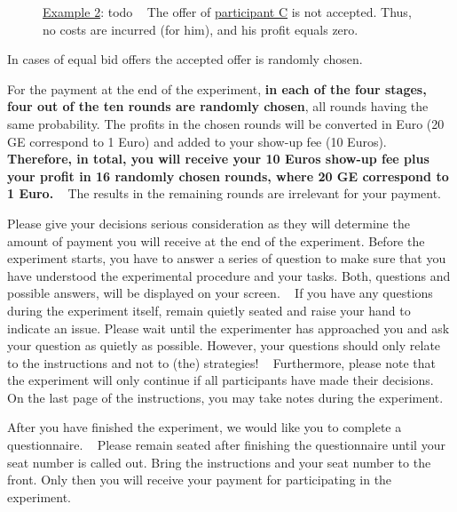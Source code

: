 \documentclass[11pt]{article}
\begin{document}
\begin{figure}[h!] 
	\begin{minipage}[t]{1\linewidth} 
		\begin{tcolorbox}[colback=pink,arc=0pt,colframe=black!25]
			\underline{Example 2}: todo ~\bigbreak 
			\vspace{4cm}
			The offer of \underline{participant C} is not accepted. Thus, no costs are incurred (for him), and his profit equals zero.         
		\end{tcolorbox} 
	\end{minipage}  
\end{figure}



In cases of equal bid offers the accepted offer is randomly chosen.



For the payment at the end of the experiment, \textbf{in each of the four stages, four out of the ten rounds are randomly chosen}, all rounds having the same probability. The profits in the chosen rounds will be converted in Euro (20 GE correspond to 1 Euro) and added to your show-up fee (10 Euros). \textbf{Therefore, in total, you will receive your 10 Euros show-up fee plus your profit in 16 randomly chosen rounds, where 20 GE correspond to 1 Euro.} ~\bigbreak
The results in the remaining rounds are irrelevant for your payment.


Please give your decisions serious consideration as they will determine the amount of payment you will receive at the end of the experiment. Before the experiment starts, you have to answer a series of question to make sure that you have understood the experimental procedure and your tasks. Both, questions and possible answers, will be displayed on your screen. ~\bigbreak
If you have any questions during the experiment itself, remain quietly seated and raise your hand to indicate an issue. Please wait until the experimenter has approached you and ask your question as quietly as possible. However, your questions should only relate to the instructions and not to (the) strategies! ~\bigbreak
Furthermore, please note that the experiment will only continue if all participants have made their decisions. ~\bigbreak
On the last page of the instructions, you may take notes during the experiment.


After you have finished the experiment, we would like you to complete a questionnaire. ~\bigbreak
Please remain seated after finishing the questionnaire until your seat number is called out. Bring the instructions and your seat number to the front. Only then you will receive your payment for participating in the experiment.
\end{document}
